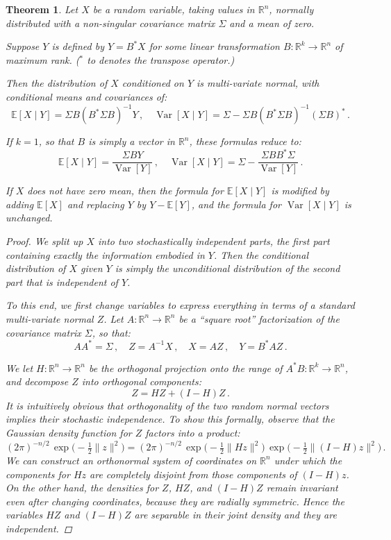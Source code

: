 \documentclass[12pt]{article}
\newtheorem*{thm*}{Theorem}
\newcommand{\R}{\mathbb{R}}
\newcommand{\norm}[1]{\lVert#1\rVert}
\newcommand{\inv}[1]{{#1}^{-1}}
\newcommand{\TR}[1]{#1^{\ast}}
\DeclareMathOperator{\Var}{Var}
\newcommand{\E}{\mathbb{E}}
\begin{document}
\begin{thm*}
Let $X$ be a random variable, taking values in $\R^n$, normally distributed
with a non-singular covariance matrix $\Sigma$ and a mean of zero.

Suppose $Y$ is defined by $Y = B^* X $ for some linear transformation $B \colon \R^k \to \R^n$
of maximum rank.
(${}^\ast$ to denotes the transpose operator.)

Then the distribution of $X$ conditioned on $Y$ is multi-variate normal,
with conditional means and covariances of:
\[
\E[ X \mid Y] = 
\Sigma B \inv{(\TR{B} \Sigma B)} Y
\,, \quad \Var[X \mid Y] = \Sigma - \Sigma B \inv{(\TR{B} \Sigma B)}  \TR{(\Sigma B)}\,.
\]

If $k = 1$, so that $B$ is simply a vector in $\R^n$,
these formulas reduce to:
\[
\E[ X \mid Y ]
= \frac{\Sigma B Y}{\Var[Y]}\,, \quad
\Var[X \mid Y] = \Sigma - \frac{\Sigma B \TR{B} \Sigma}{\Var[Y]} \,.
\]

If $X$ does not have zero mean, then the 
formula for $\E[X \mid Y]$
is modified by adding $\E[X]$ and replacing $Y$ by $Y - \E[Y]$,
and the formula for $\Var[X \mid Y]$ is unchanged.

\begin{proof}
We split up $X$ into two stochastically independent parts,
the first part containing exactly the information embodied in $Y$.
Then the conditional distribution of $X$ given $Y$ is simply
the unconditional distribution of the second part that is independent of $Y$.

To this end, we first 
change variables to express everything in terms of a \emph{standard} multi-variate normal
$Z$.  Let $A \colon \R^n \to \R^n$ be a ``square root'' factorization of 
the covariance matrix $\Sigma$,
so that:
\[
A \TR{A} = \Sigma\,, \quad Z = \inv{A} X\,, \quad X = AZ \,, \quad Y = \TR{B}AZ\,.
\]

We let $H \colon \R^n \to \R^n $ be the orthogonal projection onto the range of 
$ \TR{A} B : \R^k \to \R^n$, and decompose $Z$ into orthogonal components:
\[
Z = HZ + (I-H)Z \,.
\]
It is intuitively obvious that orthogonality 
of the two random normal vectors implies their stochastic independence.
To show this formally, observe that the Gaussian density function for $Z$
factors into a product:
\[
(2\pi)^{-n/2} \, \exp\bigl( -\tfrac12 \norm{z}^2 \bigr)
= (2\pi)^{-n/2} \, \exp\bigl( -\tfrac12 \norm{Hz}^2 \bigr) \,
                   \exp\bigl( -\tfrac12 \norm{(I-H)z}^2 \bigr) \,.
\]
We can construct an orthonormal system of coordinates on $\R^n$
under which the components for $Hz$ are
completely disjoint from those components of $(I-H)z$.
On the other hand, the densities for $Z$, $HZ$, and $(I-H)Z$
remain invariant even after changing coordinates,
because they are radially symmetric.
Hence the variables $HZ$ and $(I-H)Z$ are separable in their joint density
and they are independent.


\end{proof}
\end{thm*}
\end{document}
